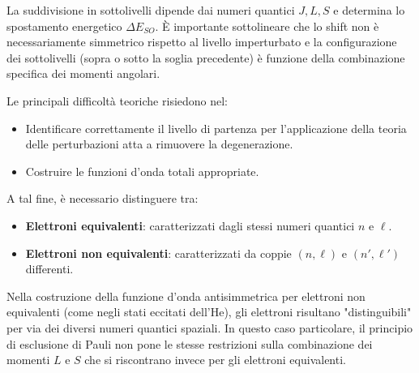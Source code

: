 La suddivisione in sottolivelli dipende dai numeri quantici \(J, L, S\) e determina lo spostamento energetico \(\Delta E_{SO}\). È importante sottolineare che lo shift non è necessariamente simmetrico rispetto al livello imperturbato e la configurazione dei sottolivelli (sopra o sotto la soglia precedente) è funzione della combinazione specifica dei momenti angolari.

Le principali difficoltà teoriche risiedono nel:
\begin{itemize}
    \item Identificare correttamente il livello di partenza per l'applicazione della teoria delle perturbazioni atta a rimuovere la degenerazione.
    \item Costruire le funzioni d'onda totali appropriate.
\end{itemize}

A tal fine, è necessario distinguere tra:
\begin{itemize}
    \item \textbf{Elettroni equivalenti}: caratterizzati dagli stessi numeri quantici \(n\) e \(\ell\).
    \item \textbf{Elettroni non equivalenti}: caratterizzati da coppie \((n, \ell)\) e \((n', \ell')\) differenti.
\end{itemize}

Nella costruzione della funzione d'onda antisimmetrica per elettroni non equivalenti (come negli stati eccitati dell'He), gli elettroni risultano "distinguibili" per via dei diversi numeri quantici spaziali. In questo caso particolare, il principio di esclusione di Pauli non pone le stesse restrizioni sulla combinazione dei momenti \(L\) e \(S\) che si riscontrano invece per gli elettroni equivalenti.

